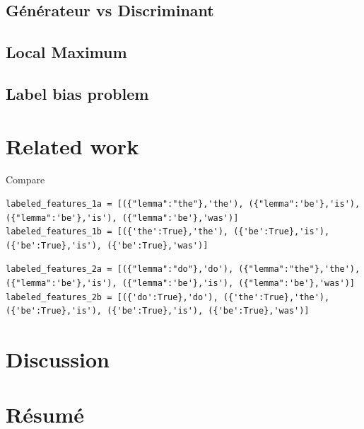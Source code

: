 \documentclass[a4paper]{article}
\begin{document}
\subsection{Générateur vs Discriminant}

\subsection{Local Maximum}

\subsection{Label bias problem}

\section{Related work}
Compare
\begin{lstlisting}
labeled_features_1a = [({"lemma":"the"},'the'), ({"lemma":'be'},'is'), ({"lemma":'be'},'is'), ({"lemma":'be'},'was')]
labeled_features_1b = [({'the':True},'the'), ({'be':True},'is'), ({'be':True},'is'), ({'be':True},'was')]
\end{lstlisting}

\begin{lstlisting}
labeled_features_2a = [({"lemma":"do"},'do'), ({"lemma":"the"},'the'), ({"lemma":'be'},'is'), ({"lemma":'be'},'is'), ({"lemma":'be'},'was')]
labeled_features_2b = [({'do':True},'do'), ({'the':True},'the'), ({'be':True},'is'), ({'be':True},'is'), ({'be':True},'was')]
\end{lstlisting}

\section{Discussion}
\section{Résumé}
\cite{greenwade93}




\end{document}

